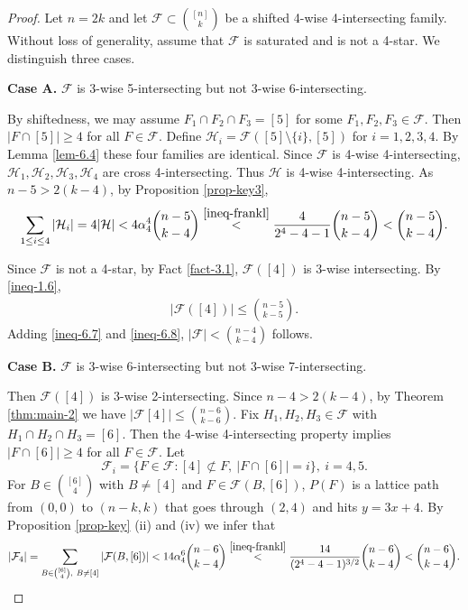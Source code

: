 \documentclass[11pt,a4paper]{article}
\newtheorem{false statement}{False statement}
\theoremstyle{definition}
\def\hh{\mathcal{H}}
\def\hf{\mathcal{F}}
\begin{document}
\begin{proof}
Let $n=2k$ and let $\hf\subset \binom{[n]}{k}$ be a shifted 4-wise 4-intersecting family. Without loss of generality, assume that $\hf$ is saturated and is not a 4-star. We distinguish three cases.

\vspace{3pt}
{\noindent\bf Case A.} $\hf$ is 3-wise 5-intersecting but not 3-wise 6-intersecting.
\vspace{3pt}

By shiftedness, we may assume $F_1\cap F_2\cap F_3=[5]$ for some $F_1,F_2,F_3\in \hf$. Then $|F\cap [5]|\geq 4$ for all  $F\in \hf$. Define $\hh_i=\hf([5]\setminus \{i\}, [5])$ for $i=1,2,3,4$. By Lemma \ref{lem-6.4} these four families are identical. Since $\hf$ is 4-wise 4-intersecting, $\hh_1,\hh_2,\hh_3,\hh_4$  are cross 4-intersecting. Thus $\hh$ is 4-wise 4-intersecting. As $n-5>2(k-4)$, by Proposition \ref{prop-key3},
\begin{align}\label{ineq-6.7}
\sum_{1\leq i\leq 4}|\hh_i| =4|\hh| <4\alpha_4^4\binom{n-5}{k-4}\overset{\eqref{ineq-frankl}}
{<}\frac{4}{2^4-4-1}\binom{n-5}{k-4}<\binom{n-5}{k-4}.
\end{align}

Since $\hf$ is not a 4-star, by Fact \ref{fact-3.1}, $\hf([4])$ is 3-wise intersecting. By \eqref{ineq-1.6},
\begin{align}\label{ineq-6.8}
|\hf([4])| \leq \binom{n-5}{k-5}.
\end{align}
Adding \eqref{ineq-6.7} and \eqref{ineq-6.8}, $|\hf|<\binom{n-4}{k-4}$ follows.


\vspace{3pt}
{\bf Case B.} $\hf$ is 3-wise 6-intersecting but not 3-wise 7-intersecting.
\vspace{3pt}

Then $\hf([4])$ is $3$-wise 2-intersecting. Since $n-4>2(k-4)$, by Theorem \ref{thm:main-2} we have $|\hf[4]|\leq \binom{n-6}{k-6}$. Fix $H_1,H_2,H_3\in \hf$ with $H_1\cap H_2\cap H_3=[6]$. Then the 4-wise 4-intersecting property implies $|F\cap [6]|\geq 4$ for all $F\in \hf$. Let
\[
\hf_i= \{F\in \hf\colon [4]\not\subset F,\ |F\cap [6]|=i\}, \ i=4,5.
\]
For  $B\in \binom{[6]}{4}$ with $B\neq [4]$ and $F\in \hf(B,[6])$, $P(F)$ is a lattice path from $(0,0)$ to $(n-k,k)$ that goes through $(2,4)$ and hits $y=3x+4$. By Proposition  \ref{prop-key} (ii) and (iv)  we infer that
\begin{align*}
|\hf_4| = \sum_{B\in \binom{[6]}{4},\ B\neq [4] }|\hf(B,[6])| <14 \alpha_4^6\binom{n-6}{k-4}\overset{\eqref{ineq-frankl}}
{<}\frac{14}{(2^4-4-1)^{3/2}}\binom{n-6}{k-4}<\binom{n-6}{k-4}.
\end{align*}


\end{proof}
\end{document}
